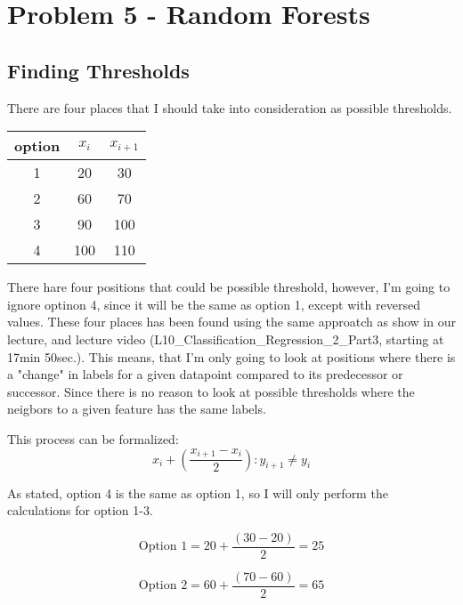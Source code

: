 \section{Problem 5 - Random Forests}
\subsection{Finding Thresholds}
There are four places that I should take into consideration as possible thresholds.

\begin{center}
    \begin{tabular}{ |c|c|c| } 
     \hline
     option & $x_i$ & $x_{i+1}$ \\
     \hline
      1 & 20 & 30 \\ 
      2 & 60 & 70 \\
      3 & 90 & 100 \\
      4 & 100 & 110 \\ 
     \hline
    \end{tabular}
\end{center}
There hare four positions that could be possible threshold, however, I'm going to ignore
optinon 4, since it will be the same as option 1, except with reversed values.
These four places has been found using the same approatch as show in our
lecture, and lecture video (L10\_Classification\_Regression\_2\_Part3, starting at 17min 50sec.).
This means, that I'm only going to look at positions where there is a "change" in labels for 
a given datapoint compared to its predecessor or successor. Since there is no reason to look at possible thresholds where the neigbors to a given feature
has the same labels. 

This process can be formalized:
$$ x_i + (\frac{x_{i+1} - x_i}{2}): y_{i+1} \neq y_i $$

As stated, option 4 is the same as option 1, so I will only perform the calculations for option 1-3.

$$ \text{Option 1} = 20 + \frac{(30 - 20)}{2} = 25$$

$$ \text{Option 2} = 60 + \frac{(70 - 60)}{2} = 65$$

